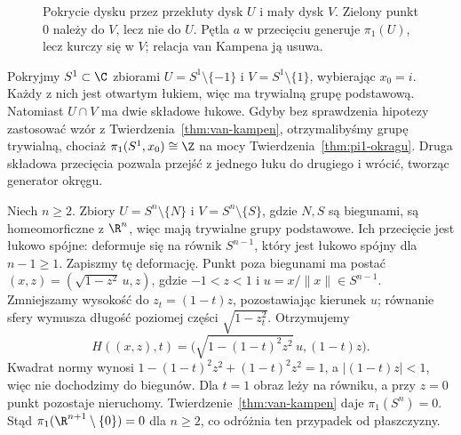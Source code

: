 \begin{figure}[!htbp]
\centering
{}
\caption{Pokrycie dysku przez przekłuty dysk $U$ i mały dysk $V$.
Zielony punkt $0$ należy do $V$, lecz nie do $U$.
Pętla $a$ w przecięciu generuje $\pi_1(U)$,
lecz kurczy się w $V$; relacja van Kampena ją usuwa.}
\label{fig:van-kampen-dysk}
\end{figure}

\begin{uwaga}
Pokryjmy $S^1\subset\C$ zbiorami
$U=S^1\setminus\{-1\}$ i $V=S^1\setminus\{1\}$,
wybierając $x_0=i$. Każdy z nich jest otwartym łukiem,
więc ma trywialną grupę podstawową. Natomiast
$U\cap V$ ma dwie składowe łukowe.
Gdyby bez sprawdzenia hipotezy zastosować wzór
z Twierdzenia~\ref{thm:van-kampen}, otrzymalibyśmy
grupę trywialną, chociaż $\pi_1(S^1,x_0)\cong\Z$
na mocy Twierdzenia~\ref{thm:pi1-okragu}.
Druga składowa przecięcia pozwala przejść z jednego
łuku do drugiego i wrócić, tworząc generator okręgu.
\end{uwaga}

\begin{przyklad}
\label{prz:pi1-sfera}
Niech $n\geq2$. Zbiory
$U=S^n\setminus\{N\}$ i
$V=S^n\setminus\{S\}$, gdzie $N,S$
są biegunami, są homeomorficzne
z $\R^n$, więc mają trywialne
grupy podstawowe. Ich przecięcie
jest łukowo spójne: deformuje się
na równik $S^{n-1}$, który jest
łukowo spójny dla $n-1\geq1$.
Zapiszmy tę deformację. Punkt poza biegunami ma postać
$(x,z)=(\sqrt{1-z^2}\,u,z)$, gdzie $-1<z<1$ i
$u=x/\|x\|\in S^{n-1}$.
Zmniejszamy wysokość do $z_t=(1-t)z$,
pozostawiając kierunek $u$; równanie sfery wymusza długość
poziomej części $\sqrt{1-z_t^2}$.
Otrzymujemy
\[
 H((x,z),t)=\bigl(\sqrt{1-(1-t)^2z^2}\,u,(1-t)z\bigr).
\]
Kwadrat normy wynosi $1-(1-t)^2z^2+(1-t)^2z^2=1$,
a $|(1-t)z|<1$, więc nie dochodzimy do biegunów.
Dla $t=1$ obraz leży na równiku, a przy $z=0$ punkt pozostaje nieruchomy.
Twierdzenie~\ref{thm:van-kampen}
daje $\pi_1(S^n)=0$.
Stąd $\pi_1(\R^{n+1}\setminus\{0\})=0$
dla $n\geq2$, co odróżnia ten
przypadek od płaszczyzny.
\end{przyklad}

